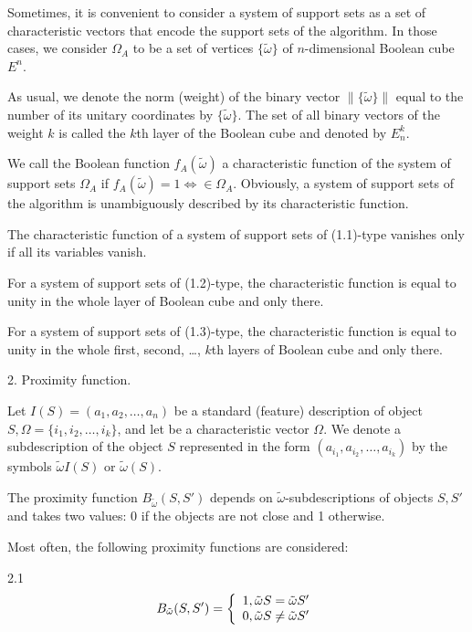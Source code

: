 Sometimes, it is convenient to consider a system of support sets as a set of characteristic 
vectors that encode the support sets of the algorithm. In those cases, we consider $\Omega_A$ 
to be a set of vertices $\{\tilde{\omega}\}$ of $n$-dimensional Boolean cube $E^n$. 

As usual, we denote the norm (weight) of the binary vector $\|\{\tilde{\omega}\}\|$ equal to 
the number of its unitary coordinates by $\{\tilde{\omega}\}$. The set of all binary vectors 
of the weight $k$ is called the $k$th layer of the Boolean cube and denoted by $E_n^k$.

We call the Boolean function $f_A(\tilde{\omega})$ a characteristic function of the system of support 
sets $\Omega_A$ if $f_A(\tilde{\omega})=1\Leftrightarrow \in \Omega_A$. Obviously, a system of support 
sets of the algorithm is unambiguously described by its characteristic function. 

The characteristic function of a system of support sets of (1.1)-type vanishes only if all its 
variables vanish.

For a system of support sets of (1.2)-type, the characteristic function is 
equal to unity in the whole layer of Boolean cube and only there.

For a system of support sets of (1.3)-type, the characteristic function is equal to 
unity in the whole first, second, \ldots, $k$th layers of Boolean cube and only there.   

2. Proximity function.

Let $I(S) = (a_1, a_2, \ldots, a_n)$ be a standard (feature) description of 
object $S, \Omega = \{i_1, i_2,\ldots, i_k\}$, and let  be a characteristic 
vector $\Omega$. We denote a subdescription of the object $S$ represented in 
the form $(a_{i_1}, a_{i_2} ,\ldots,a_{i_k})$ by the symbols 
$\tilde{\omega} I(S)$ or $\tilde{\omega}(S)$.

The proximity function $B_{\tilde{\omega}}(S, S')$ depends on $\tilde{\omega}$-subdescriptions 
of objects $S, S'$ and takes two values: 0 if the objects are not close and 1 otherwise. 

Most often, the following proximity functions are considered:

2.1
\begin{equation}
B_{\tilde{\omega}}(S, S') = \left\{ 
  \begin{array}{l l}
    1, \tilde{\omega}S = \tilde{\omega}S' \\
    0, \tilde{\omega}S \neq \tilde{\omega}S'
  \end{array} \right.
\end{equation}

